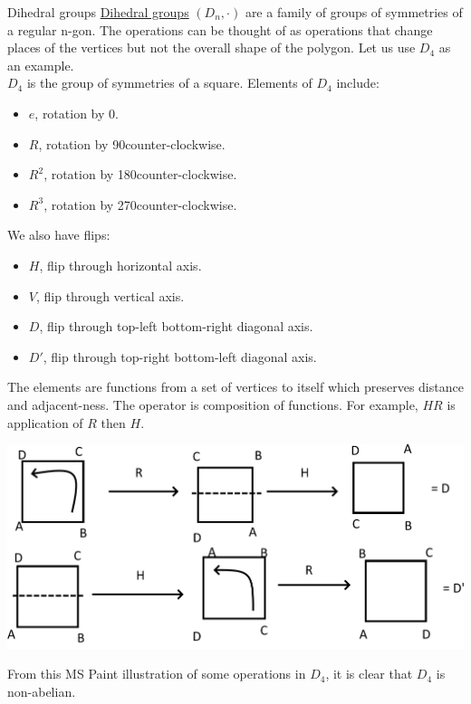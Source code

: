 \documentclass[12pt]{article}
\begin{document}
	\begin{myex}{Dihedral groups}{}
		\underline{Dihedral groups}	$(D_n, \cdot)$ are a family of groups of symmetries of a regular n-gon. The operations can be thought of as operations that change places of the vertices but not the overall shape of the polygon. Let us use $D_4$ as an example.\\
		
		$D_4$ is the group of symmetries of a square. Elements of $D_4$ include:
		\begin{itemize}
			\item $e$, rotation by 0\textdegree.
			\item $R$, rotation by 90\textdegree counter-clockwise.
			\item $R^2$, rotation by 180\textdegree counter-clockwise.
			\item $R^3$, rotation by 270\textdegree counter-clockwise.
		\end{itemize}
		We also have flips:
		\begin{itemize}
			\item $H$, flip through horizontal axis.
			\item $V$, flip through vertical axis.
			\item $D$, flip through top-left bottom-right diagonal axis.
			\item $D'$, flip through top-right bottom-left diagonal axis.
		\end{itemize}
		The elements are functions from a set of vertices to itself which preserves distance and adjacent-ness. The operator is composition of functions. For example, $HR$ is application of $R$ then $H$.
		
		\includegraphics[scale=0.3]{Fig1.png}
		
		From this MS Paint illustration of some operations in $D_4$, it is clear that $D_4$ is non-abelian.
	\end{myex}
	
\end{document}
